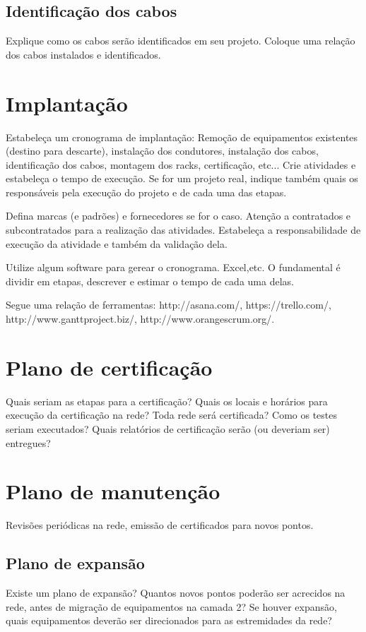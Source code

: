 \documentclass[	DIV=calc,%
							paper=a4,%
							fontsize=12pt,%
							onecolumn]{scrartcl}	 					%
\begin{document}
\subsection{Identificação dos cabos}
Explique como os cabos serão identificados em seu projeto. Coloque uma relação dos cabos instalados e identificados.

\section{Implantação}
Estabeleça um cronograma de implantação:
Remoção de equipamentos existentes (destino para descarte), instalação dos condutores, instalação dos cabos, 
identificação dos cabos, montagem dos racks, certificação, etc... Crie atividades e estabeleça o tempo de execução. Se for um projeto real, indique também quais os responsáveis pela execução do projeto e de cada uma das etapas.

Defina marcas (e padrões) e fornecedores se for o caso. Atenção a contratados e subcontratados para a realização das atividades. Estabeleça a responsabilidade de execução da atividade e também da validação dela.

Utilize algum software para gerear o cronograma. Excel,etc. O fundamental é dividir em etapas, descrever e estimar o tempo de cada uma delas.

Segue uma relação de ferramentas:
http://asana.com/, 
https://trello.com/, 
http://www.ganttproject.biz/, 
http://www.orangescrum.org/. 

\section{Plano de certificação}
Quais seriam as etapas para a certificação? 
Quais os locais e horários para execução da certificação na rede? Toda rede será certificada?
Como os testes seriam executados?
Quais relatórios de certificação serão (ou deveriam ser) entregues? 

\section{Plano de manutenção}

Revisões periódicas na rede, emissão de certificados para novos pontos.

\subsection{Plano de expansão}
Existe um plano de expansão? Quantos novos pontos poderão ser acrecidos na rede, antes de migração de equipamentos na camada 2? Se houver expansão, quais equipamentos deverão ser direcionados para as estremidades da rede? 
\end{document}
